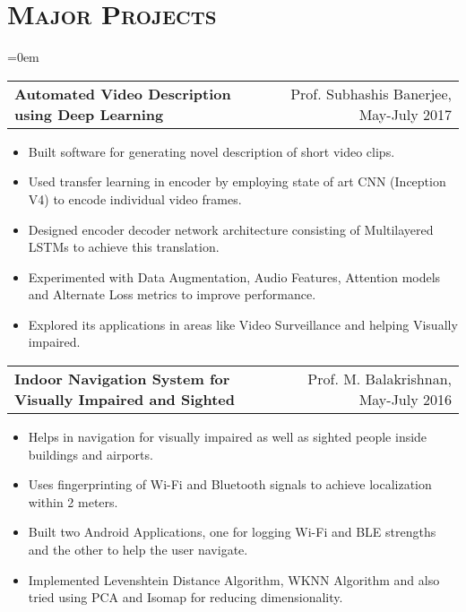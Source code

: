 \documentclass{article}
\makeatletter
\newcommand{\headerrow}[2]
{\begin{tabular*}{\linewidth}{l@{\extracolsep{\fill}}r}
    #1 &
    #2 \\
\end{tabular*}}
\newcommand{\tmpsection}[1]{}
\let\tmpsection=\section
\renewcommand{\section}[1]{\tmpsection*{\textsc{#1}}}
\makeatother
\begin{document}
\section{Major Projects}
\begin{list} {}{\leftmargin=0em}
\setlength{\leftmargin}{0pt}

    \item[]
    \headerrow {\textbf{Automated Video Description using Deep Learning}}{Prof. Subhashis Banerjee, May-July 2017}
    \begin{itemize}
    \setlength\itemsep{0.0em}
        \item Built software for generating novel description of short video clips.
        \item Used transfer learning in encoder by employing state of art CNN (Inception V4) to encode individual video frames.
        \item Designed encoder decoder network architecture consisting of Multilayered LSTMs to achieve this translation.
        \item Experimented with Data Augmentation, Audio Features, Attention models and  Alternate Loss metrics to improve performance.
        \item Explored its applications in areas like Video Surveillance and helping Visually impaired.
    \end{itemize}
    \item[]
    \headerrow {\textbf{Indoor Navigation System for Visually Impaired and Sighted}}{Prof. M. Balakrishnan, May-July 2016}
    \begin{itemize}
    \setlength\itemsep{0.0em}
        \item Helps in navigation for visually impaired as well as sighted people inside buildings and airports.
        \item Uses fingerprinting of Wi-Fi and Bluetooth signals to achieve localization within 2 meters.
        \item Built two Android Applications, one for logging Wi-Fi and BLE strengths and the other to help the user navigate.
        \item Implemented Levenshtein Distance Algorithm, WKNN Algorithm and also tried using  PCA and Isomap for reducing dimensionality.
    \end{itemize}



\end{list}
\end{document}
